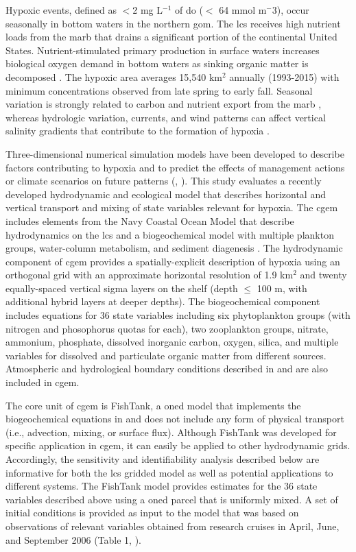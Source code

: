 \documentclass[letterpaper,12pt,oneside]{article}\usepackage[]{graphicx}\usepackage[]{color}
\begin{document}
Hypoxic events, defined  as $<$2 mg L$^{-1}$ of \ac{do} ($<$ 64 mmol m$^-3$), occur seasonally in bottom waters in the northern \ac{gom}.  The \ac{lcs} receives high nutrient loads from the \ac{marb} that drains a significant portion of the continental United States.  Nutrient-stimulated primary production in surface waters increases biological oxygen demand in bottom waters as sinking organic matter is decomposed \citep{Bierman94,Murrell13}.  The hypoxic area averages 15,540 km$^2$ annually (1993-2015) with minimum concentrations observed from late spring to early fall.  Seasonal variation is strongly related to carbon and nutrient export from the \ac{marb} \citep{Lohrenz08,Bianchi10}, whereas hydrologic variation, currents, and wind patterns can affect vertical salinity gradients that contribute to the formation of hypoxia \citep{Wiseman97,Obenour15}. 

Three-dimensional numerical simulation models have been developed to describe factors contributing to hypoxia and to predict the effects of management actions or climate scenarios on future patterns (\citealt{Fennel13,Pauer16}, ).  This study evaluates a recently developed hydrodynamic and ecological model that describes horizontal and vertical transport and mixing of state variables relevant for hypoxia.  The \ac{cgem} includes elements from the Navy Coastal Ocean Model \citep{Martin00} that describe hydrodynamics on the \ac{lcs} and a biogeochemical model with multiple plankton groups, water-column metabolism, and sediment diagenesis \citep{Eldridge10}.  The hydrodynamic component of \ac{cgem} provides a spatially-explicit description of hypoxia using an orthogonal grid with an approximate horizontal resolution of 1.9 km$^2$ and twenty equally-spaced vertical sigma layers on the shelf (depth $\leq$ 100 m, with additional hybrid layers at deeper depths).  The biogeochemical component includes equations for 36 state variables including six phytoplankton groups (with nitrogen and phosophorus quotas for each), two zooplankton groups, nitrate, ammonium, phosphate, dissolved inorganic carbon, oxygen, silica, and multiple variables for dissolved and particulate organic matter from different sources.  Atmospheric and hydrological boundary conditions described in \citet{Hodur97} and \citet{Lehrter13} are also included in \ac{cgem}.

The core unit of \ac{cgem} is FishTank, a \ac{oned} model that implements the biogeochemical equations in \citet{Eldridge10} and does not include any form of physical transport (i.e., advection, mixing, or surface flux).  Although FishTank was developed for specific application in \ac{cgem}, it can easily be applied to other hydrodynamic grids. Accordingly, the sensitivity and identifiability analysis described below are informative for both the \ac{lcs} gridded model as well as potential applications to different systems.  The FishTank model provides estimates for the 36 state variables described above using a \ac{oned} parcel that is uniformly mixed.  A set of initial conditions is provided as input to the model that was based on observations of relevant variables obtained from research cruises in April, June, and September 2006 (Table 1, \citet{Murrell14}). 
\end{document}
